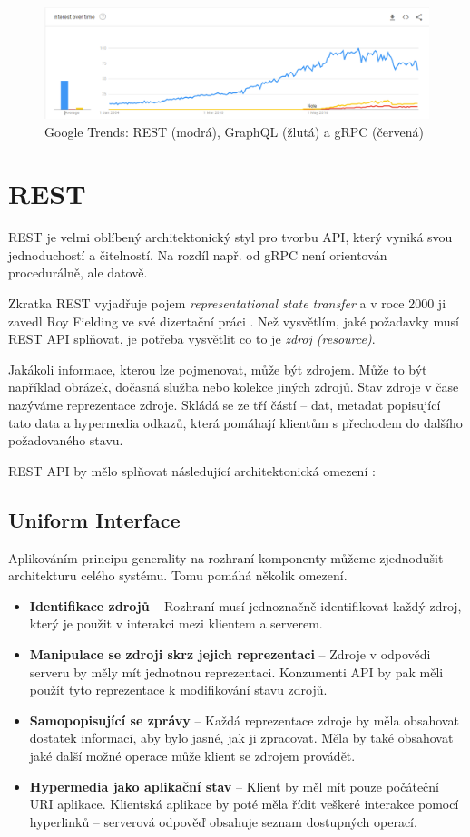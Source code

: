 \documentclass[thesis=M,czech]{FITthesis}[2019/12/23]
\begin{document}
\begin{figure}[h]
    \includegraphics[width=\linewidth]{img/interest_trend.png}
    \caption{Google Trends: REST (modrá), GraphQL (žlutá) a gRPC (červená) \cite{google-trends}}
	\label{google_trends_img}
\end{figure}

\section{REST}
REST je velmi oblíbený architektonický styl pro tvorbu API, který vyniká svou jednoduchostí a čitelností. Na rozdíl např. od gRPC není orientován procedurálně, ale datově.

Zkratka REST vyjadřuje pojem \textit{representational state transfer} a v roce 2000 ji zavedl Roy Fielding ve své dizertační práci \cite{fielding00}. Než vysvětlím, jaké požadavky musí REST API splňovat, je potřeba vysvětlit co to je \textit{zdroj (resource)}.

Jakákoli informace, kterou lze pojmenovat, může být zdrojem. Může to být například obrázek, dočasná služba nebo kolekce jiných zdrojů. Stav zdroje v čase nazýváme reprezentace zdroje. Skládá se ze tří částí -- dat, metadat popisující tato data a hypermedia odkazů, která pomáhají klientům s přechodem do dalšího požadovaného stavu.

REST API by mělo splňovat následující architektonická omezení \cite{restful_api}:

\subsection{Uniform Interface}
Aplikováním principu generality na rozhraní komponenty můžeme zjednodušit architekturu celého systému. Tomu pomáhá několik omezení.
\begin{itemize}
    \item \textbf{Identifikace zdrojů} -- Rozhraní musí jednoznačně identifikovat každý zdroj, který je použit v interakci mezi klientem a serverem.
    \item \textbf{Manipulace se zdroji skrz jejich reprezentaci} -- Zdroje v odpovědi serveru by měly mít jednotnou reprezentaci. Konzumenti API by pak měli použít tyto reprezentace k modifikování stavu zdrojů.
    \item \textbf{Samopopisující se zprávy} -- Každá reprezentace zdroje by měla obsahovat dostatek informací, aby bylo jasné, jak ji zpracovat. Měla by také obsahovat jaké další možné operace může klient se zdrojem provádět.
    \item \textbf{Hypermedia jako aplikační stav} -- Klient by měl mít pouze počáteční URI aplikace. Klientská aplikace by poté měla řídit veškeré interakce pomocí hyperlinků -- serverová odpověď obsahuje seznam dostupných operací.
\end{itemize}
\end{document}
